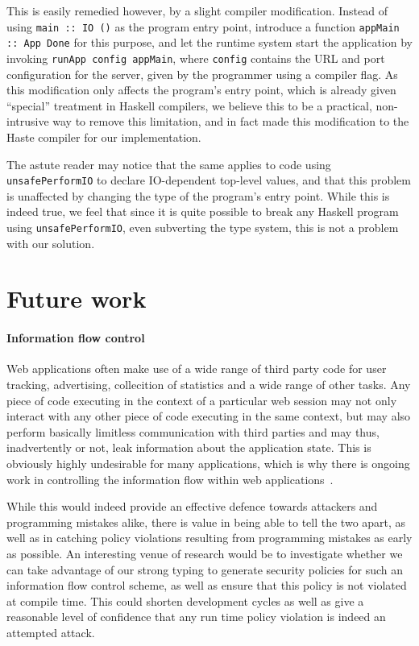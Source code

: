 \documentclass[preprint]{sigplanconf}
\begin{document}
This is easily remedied however, by a slight compiler modification. Instead of
using \lstinline!main :: IO ()! as the program entry point, introduce a function
\lstinline!appMain :: App Done! for this purpose, and let the runtime system
start the application by invoking \lstinline!runApp config appMain!, where
\lstinline!config! contains the URL and port configuration for the server, given
by the programmer using a compiler flag. As this modification only affects the
program's entry point, which is already given ``special'' treatment in Haskell
compilers, we believe this to be a practical, non-intrusive way to remove this
limitation, and in fact made this modification to the Haste compiler for our
implementation.

The astute reader may notice that the same applies to code using
\lstinline!unsafePerformIO! to declare IO-dependent top-level values, and that
this problem is unaffected by changing the type of the program's entry point.
While this is indeed true, we feel that since it is quite possible to break
any Haskell program using \lstinline!unsafePerformIO!, even subverting the type
system, this is not a problem with our solution.

\section{Future work}

\paragraph{Information flow control} Web applications often make use of a wide
range of third party code for user tracking, advertising, collecition of
statistics and a wide range of other tasks. Any piece of code executing in the
context of a particular web session may not only interact with any other piece
of code executing in the same context, but may also perform basically limitless
communication with third parties and may thus, inadvertently or not, leak
information about the application state. This is obviously highly undesirable
for many applications, which is why there is ongoing work in controlling the
information flow within web applications\ \cite{jsflow}.

While this would indeed provide an effective defence towards attackers and
programming mistakes alike, there is value in being able to tell the two apart,
as well as in catching policy violations resulting from programming mistakes
as early as possible. An interesting venue of research would be to investigate
whether we can take advantage of our strong typing to generate security policies
for such an information flow control scheme, as well as ensure that this policy
is not violated at compile time. This could shorten development cycles as well
as give a reasonable level of confidence that any run time policy violation is
indeed an attempted attack.
\end{document}
